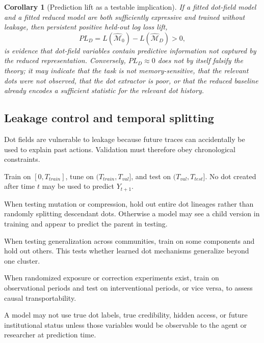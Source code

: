 \documentclass[11pt]{article}
\newtheorem{corollary}{Corollary}
\theoremstyle{remark}
\begin{document}
\begin{corollary}[Prediction lift as a testable implication]
If a fitted dot-field model and a fitted reduced model are both sufficiently
expressive and trained without leakage, then persistent positive held-out log
loss lift,
\[
PL_D=L(\widehat{\mathcal M}_0)-L(\widehat{\mathcal M}_D)>0,
\]
is evidence that dot-field variables contain predictive information not captured
by the reduced representation. Conversely, \(PL_D\approx 0\) does not by itself
falsify the theory; it may indicate that the task is not memory-sensitive, that
the relevant dots were not observed, that the dot extractor is poor, or that the
reduced baseline already encodes a sufficient statistic for the relevant dot
history.
\end{corollary}

\subsection{Leakage control and temporal splitting}\label{leakage-control-temporal-splitting}

Dot fields are vulnerable to leakage because future traces can accidentally be
used to explain past actions. Validation must therefore obey chronological
constraints.

\begin{description}[leftmargin=3.2cm,style=nextline]
\item[Temporal split]
Train on \([0,T_{train}]\), tune on \((T_{train},T_{val}]\), and test on
\((T_{val},T_{test}]\). No dot created after time \(t\) may be used to predict
\(Y_{t+1}\).

\item[Lineage split]
When testing mutation or compression, hold out entire dot lineages rather than
randomly splitting descendant dots. Otherwise a model may see a child version in
training and appear to predict the parent in testing.

\item[Component split]
When testing generalization across communities, train on some components and
hold out others. This tests whether learned dot mechanisms generalize beyond
one cluster.

\item[Intervention split]
When randomized exposure or correction experiments exist, train on observational
periods and test on interventional periods, or vice versa, to assess causal
transportability.

\item[No-oracle rule]
A model may not use true dot labels, true credibility, hidden access, or future
institutional status unless those variables would be observable to the agent or
researcher at prediction time.
\end{description}
\end{document}
